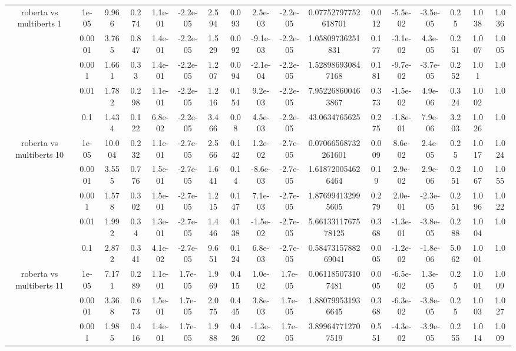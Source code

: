 \begin{tabular}{|c|c|c|c|c|c|c|c|c|c|c|c|c|c|c|c|c|}
\hline
\multirow{5}{*}{roberta  vs multiberts 1} & 1e-05 & 9.966 & 0.274 & 1.1e-01 & -2.2e-05 & 2.594 & 0.093 & 2.5e-03 & -2.2e-05 & 0.07752797752618701 & 0.012 & -5.5e-02 & -3.5e-05 & 0.25 & 1.038 & 1.036 \\
 & 0.0001 & 3.765 & 0.847 & 1.4e-01 & -2.2e-05 & 1.529 & 0.092 & -9.1e-03 & -2.2e-05 & 1.05809736251831 & 0.177 & -3.1e-02 & 4.3e-05 & 0.251 & 1.007 & 1.005 \\
 & 0.001 & 1.661 & 0.33 & 1.4e-01 & -2.2e-05 & 1.207 & 0.094 & -2.1e-04 & -2.2e-05 & 1.528986930847168 & 0.181 & -9.7e-02 & -3.7e-05 & 0.252 & 1.01 & 1.0 \\
 & 0.01 & 1.782 & 0.298 & 1.1e-01 & -2.2e-05 & 1.216 & 0.154 & 9.2e-03 & -2.2e-05 & 7.952268600463867 & 0.373 & -1.5e-02 & 4.9e-06 & 0.324 & 1.002 & 1.0 \\
 & 0.1 & 1.434 & 0.122 & 6.8e-02 & -2.2e-05 & 3.466 & 0.08 & 4.5e-03 & -2.2e-05 & 43.0634765625 & 0.275 & -1.8e-01 & 7.9e-06 & 3.203 & 1.026 & 1.0 \\
\hline
\multirow{5}{*}{roberta  vs multiberts 10} & 1e-05 & 10.004 & 0.232 & 1.1e-01 & -2.7e-05 & 2.566 & 0.142 & 1.2e-02 & -2.7e-05 & 0.07066568732261601 & 0.009 & 8.6e-02 & 2.4e-05 & 0.25 & 1.017 & 1.024 \\
 & 0.0001 & 3.555 & 0.776 & 1.5e-01 & -2.7e-05 & 1.641 & 0.14 & -8.6e-03 & -2.7e-05 & 1.618720054626464 & 0.19 & 2.9e-02 & 2.9e-06 & 0.251 & 1.067 & 1.055 \\
 & 0.001 & 1.578 & 0.302 & 1.5e-01 & -2.7e-05 & 1.215 & 0.147 & 7.1e-03 & -2.7e-05 & 1.876994132995605 & 0.279 & 2.0e-01 & -2.3e-05 & 0.251 & 1.096 & 1.022 \\
 & 0.01 & 1.992 & 0.34 & 1.3e-01 & -2.7e-05 & 1.446 & 0.138 & -1.5e-02 & -2.7e-05 & 5.6613311767578125 & 0.368 & -1.3e-01 & -3.8e-05 & 0.288 & 1.004 & 1.0 \\
 & 0.1 & 2.872 & 0.341 & 4.1e-02 & -2.7e-05 & 9.651 & 0.124 & 6.8e-03 & -2.7e-05 & 0.5847315788269041 & 0.005 & -1.2e-02 & -1.8e-06 & 5.062 & 1.001 & 1.0 \\
\hline
\multirow{5}{*}{roberta  vs multiberts 11} & 1e-05 & 7.171 & 0.289 & 1.1e-01 & 1.7e-05 & 1.969 & 0.415 & 1.0e-02 & 1.7e-05 & 0.061185073107481 & 0.005 & -6.5e-02 & 1.3e-05 & 0.25 & 1.001 & 1.009 \\
 & 0.0001 & 3.368 & 0.673 & 1.5e-01 & 1.7e-05 & 2.075 & 0.445 & 3.8e-03 & 1.7e-05 & 1.880799531936645 & 0.368 & -6.3e-02 & -3.8e-05 & 0.25 & 1.003 & 1.027 \\
 & 0.001 & 1.985 & 0.416 & 1.4e-01 & 1.7e-05 & 1.988 & 0.426 & -1.3e-02 & 1.7e-05 & 3.899647712707519 & 0.551 & -4.3e-02 & -3.9e-05 & 0.255 & 1.014 & 1.009 \\

\end{tabular}

